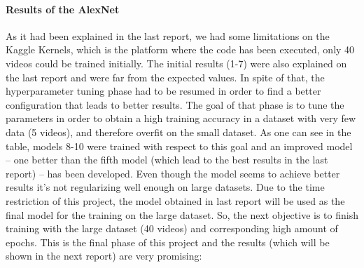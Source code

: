 \documentclass{article}
\begin{document}
\paragraph{\textbf{Results of the AlexNet}}
As it had been explained in the last report, we had some limitations on the Kaggle Kernels, which is the platform where the code has been executed, only 40 videos could be trained initially.
The initial results (1-7) were also explained on the last report and were far from the expected values.
In spite of that, the hyperparameter tuning phase had to be resumed in order to find a better configuration that leads to better results. The goal of that phase is to tune the parameters in order to obtain a high training accuracy in a dataset with very few data (5 videos), and therefore overfit on the small dataset. 
As one can see in the table, models 8-10 were trained with respect to this goal and an improved model -- one better than the fifth model (which lead to the best results in the last report) -- has been developed. Even though the model seems to achieve better results it's not regularizing well enough on large datasets. Due to the time restriction of this project, the model obtained in last report will be used as the final model for the training on the large dataset. So, the next objective is to finish training with the large dataset (40 videos) and corresponding high amount of epochs. This is the final phase of this project and the results (which will be shown in the next report) are very promising:   
\end{document}
